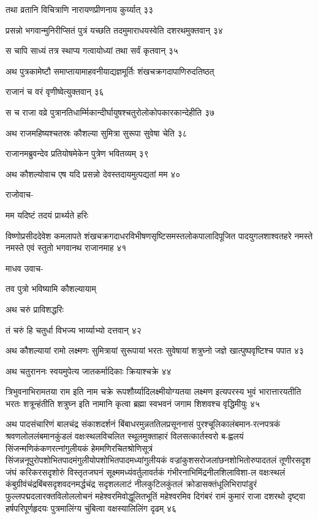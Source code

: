 तथा व्रतानि विचित्राणि नारायणप्रीणनाय कुर्य्यात् ३३

प्रसन्नो भगवान्मुनिरीप्सितं पुत्रं यच्छति तदमुमाराधयस्वेति दशरथमुक्तवान् ३४

स चापि साध्यं तत्र स्थाप्य गत्वायोध्यां तथा सर्वं कृतवान् ३५

अथ पुत्रकामेष्टौ समाप्तायामाहवनीयाद्यज्ञमूर्तिः शंखचक्रगदापाणिरुदतिष्ठत्

राजानं च वरं वृणीष्वेत्युक्तवान् ३६

स च राजा वव्रे पुत्रानतिधार्म्मिकान्दीर्घायुषश्चतुरोलोकोपकारकान्देहीति ३७

अथ राजमहिष्यश्चतस्रः कौशल्या सुमित्रा सुरूपा सुवेषा चेति ३८

राजानमब्रुवन्देव प्रतियोषमेकेन पुत्रेण भवितव्यम् ३९

अथ कौशल्योवाच एष यदि प्रसन्नो देवस्तदायमुत्पद्यतां मम ४०

राजोवाच-

मम यदिष्टं तदयं प्रार्थ्यते हरिः

विष्णोप्रसीददेवेश कमलापते शंखचक्रगदाधरविभीषणसृष्टिसमस्तलोकपालादिपूजित पादयुगलशाश्वतहरे
नमस्ते नमस्ते एवं स्तुतो भगवानथ राजानमाह ४१

माधव उवाच-

तव पुत्रो भविष्यामि कौशल्यायाम्

अथ चरुं प्राविशद्धरिः

तं चरुं हि चतुर्धा विभज्य भार्य्याभ्यो दत्तवान् ४२

अथ कौशल्यायां रामो लक्ष्मणः सुमित्रायां सुरूपायां भरतः सुवेषायां शत्रुघ्नो जज्ञे
खात्पुष्पवृष्टिश्च पपात ४३

अथ चतुराननः स्वयमुपेत्य जातकर्मादिकाः क्रियाश्चक्रे ४४

त्रिभुवनाभिरामतया राम इति नाम चक्रे रूपशौर्य्यादिलक्ष्मीयोग्यतया लक्ष्मण इत्यपरस्य भुवं
भारात्तारयतीति भरतः शत्रून्हंतीति शत्रुघ्न इति नामानि कृत्वा ब्रह्मा स्वभवनं जगाम
शिशवश्च वृद्धिमीयुः ४५

अथ पादसंचारिणं बालचंद्र संकाशदर्शनं बिंबाधरमुन्नततिलप्रसूननासं पुरश्चूलिकालंबमान-रत्नपत्रकं
श्रवणलोललंबमानकुंडलं वक्षःस्थलविचलित स्थूलमुक्ताहारं विलसत्कार्तस्वरो ब-ह्वलयं
सिंजन्मणिकंकणरत्नांगुलीयकं हेममणिरचितश्रोणिसूत्रं
सिंजन्ननूपुरोपशोभितपादमंगुलीयोपशोभितपादमध्यांगुलीयकं वज्रांकुशसरोजलांछनशोभितोरुपादतलं
तूणीरसदृश जंघं करिकरसदृशोरुं विस्तृतजघनं सूक्ष्ममध्यंवर्तुलावर्तकं
गंभीरनाभिमिंद्रनीलशिलाविशा-ल वक्षःस्थलं कंबुग्रीवंचंद्रबिंबसदृशवदनमर्द्धचंद्र सदृशललाटं
नीलकुटिलकुंतलं क्रोडासक्तंधूलिभिरापांडुरं फुल्लपद्मदलारक्तविलोललोचनं महेश्वरमिवोद्धूलितभूतिं
महेश्वरमिव दिगंबरं रामं कुमारं राजा दशरथो दृष्ट्वा हर्षपरिपूर्णहृदयः पुत्रमालिंग्य चुंबित्वा
वक्षस्यालिलिंग दृढम् ४६

